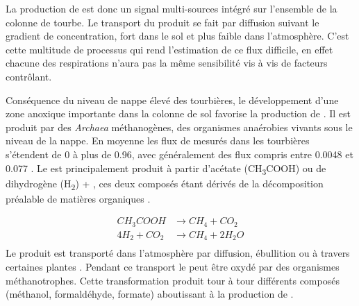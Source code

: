 La production de \coo est donc un signal multi-sources intégré sur l'ensemble de la colonne de tourbe.
Le transport du \coo produit se fait par diffusion suivant le gradient de concentration, fort dans le sol et plus faible dans l'atmosphère.
C'est cette multitude de processus qui rend l'estimation de ce flux difficile, en effet chacune des respirations n'aura pas la même sensibilité vis à vis de facteurs contrôlant.




Conséquence du niveau de nappe élevé des tourbières, le développement d'une zone anoxique importante dans la colonne de sol favorise la production de \chh.
Il est produit par des \textit{Archaea} méthanogènes, des organismes anaérobies vivants sous le niveau de la nappe.
En moyenne les flux de \chh mesurés dans les tourbières s'étendent de 0 à plus de \SI{0.96}{\uml}, avec généralement des flux compris entre \num{0.0048} et \SI{0.077}{\uml} \citep{blodau2002}.
Le \chh est principalement produit à partir d'acétate (CH\textsubscript{3}COOH) ou de dihydrogène (H\textsubscript{2}) + \coo, ces deux composés étant dérivés de la décomposition préalable de matières organiques \citep{lai2009}.

$$\begin{aligned}
CH_{3}COOH  &\rightarrow CH_{4} + CO_{2}\\
4H_{2} + CO_{2} &\rightarrow CH_{4} + 2H_{2}O\\
\end{aligned} $$
Le \chh produit est transporté dans l'atmosphère par diffusion, ébullition ou à travers certaines plantes \citep{joabsson1999,colmer2003}.
Pendant ce transport le \chh peut être oxydé par des organismes méthanotrophes.
Cette transformation produit tour à tour différents composés (méthanol, formaldéhyde, formate) aboutissant à la production de \coo \citep{whalen2005}.

